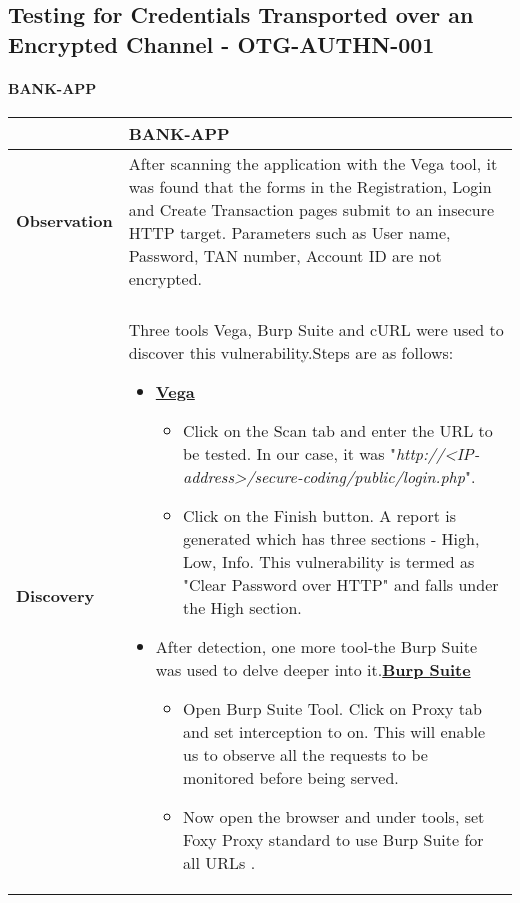 \subsection{Testing for Credentials Transported over an Encrypted Channel - OTG-AUTHN-001} \label{OTG-AUTHN-001}

\paragraph{BANK-APP} \mbox{}
\begin{longtable*}{p{.20\textwidth} | p{.80\textwidth}}
    \hline
    & \textbf{BANK-APP} \\
    \hline
    \textbf{Observation} &
     After scanning the application with the Vega tool, it was found that the forms in the Registration, Login and Create Transaction pages submit to an insecure HTTP target. Parameters such as User name, Password, TAN number, Account ID are not encrypted. 
    \\\\
    \textbf{Discovery} &
       Three tools Vega, Burp Suite and cURL were used to discover this vulnerability.Steps are as follows:
       \begin{itemize}
       	\item \underline{\textbf{Vega}}
       		\begin{itemize}
       			\item Click on the Scan tab and enter the URL to be tested. In our case, it was "\textit{http://<IP-address>/secure-coding/public/login.php}".
       			
       			\item Click on the Finish button. A report is generated which has three sections - High, Low, Info. This vulnerability is termed as "Clear Password over HTTP" and falls under the High section.
       		\end{itemize}
       	\item After detection, one more tool-the Burp Suite was used to delve deeper into it.\underline{\textbf{Burp Suite}}
       		\begin{itemize}
       			\item Open Burp Suite Tool. Click on Proxy tab and set interception to on. This will enable us to observe all the requests to be monitored before being served.
       			
       		  \item Now open the browser and under tools, set Foxy Proxy standard to use Burp Suite for all URLs .
       		  

\end{itemize}
\end{itemize}
\end{longtable*}
